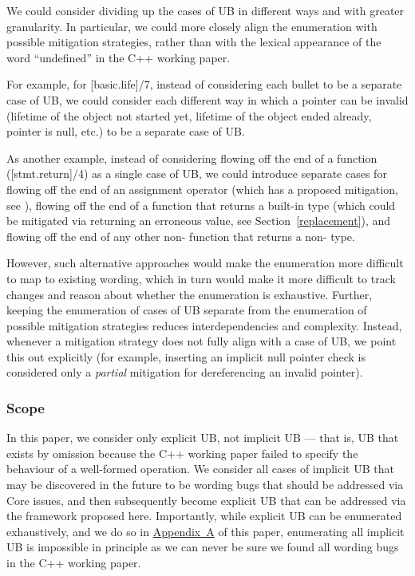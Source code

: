 We could consider dividing up the cases of UB in different ways and with greater granularity. In particular, we could more closely align the enumeration with possible mitigation strategies, rather than with the lexical appearance of the word ``undefined'' in the C++ working paper.

For example, for [basic.life]/7, instead of considering each bullet to be a separate case of UB, we could consider each different way in which a pointer can be invalid (lifetime of the object not started yet, lifetime of the object ended already, pointer is null, etc.) to be a separate case of UB.

As another example, instead of considering flowing off the end of a function ([stmt.return]/4) as a single case of UB, we could introduce separate cases for flowing off the end of an assignment operator (which has a proposed mitigation, see \cite{P2973R0}), flowing off the end of a function that returns a built-in type (which could be mitigated via returning an erroneous value, see Section~\ref{replacement}), and flowing off the end of any other non- function that returns a non- type.

However, such alternative approaches would make the enumeration more difficult to map to existing wording, which in turn would make it more difficult to track changes and reason about whether the enumeration is exhaustive. Further, keeping the enumeration of cases of UB separate from the enumeration of possible mitigation strategies reduces interdependencies and complexity. Instead, whenever a mitigation strategy does not fully align with a case of UB, we point this out explicitly (for example, inserting an implicit null pointer check is considered only a \emph{partial} mitigation for dereferencing an invalid pointer).

\subsubsection{Scope}
\label{enum_scope}

In this paper, we consider only explicit UB, not implicit UB --- that is, UB that exists by omission because the C++ working paper failed to specify the behaviour of a well-formed operation. We consider all cases of implicit UB that may be discovered in the future to be wording bugs that should be addressed via Core issues, and then subsequently become explicit UB that can be addressed  via the framework proposed here. Importantly, while explicit UB can be enumerated exhaustively, and we do so in \hyperref[appendix]{Appendix~A} of this paper, enumerating all implicit UB is impossible in principle as we can never be sure we found all wording bugs in the C++ working paper.

